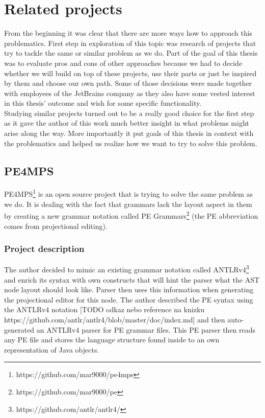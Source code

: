 \chapter{Related projects}

From the beginning it was clear that there are more ways how to approach this problematics. First step in exploration of this topic was research of projects that try to tackle the same or similar problem as we do. Part of the goal of this thesis was to evaluate pros and cons of other approaches because we had to decide whether we will build on top of these projects, use their parts or just be inspired by them and choose our own path. Some of those decisions were made together with employees of the JetBrains company as they also have some vested interest in this thesis' outcome and wish for some specific functionality.
\\

Studying similar projects turned out to be a really good choice for the first step as it gave the author of this work much better insight in what problems might arise along the way. More importantly it put goals of this thesis in context with the problematics and helped us realize how we want to try to solve this problem.

\section{PE4MPS}
PE4MPS\footnote{https://github.com/mar9000/pe4mps} is an open source project that is trying to solve the same problem as we do. It is dealing with the fact that grammars lack the layout aspect in them by creating a new grammar notation called PE Grammars\footnote{https://github.com/mar9000/pe} (the PE abbreviation comes from projectional editing).
 
\subsection{Project description}
The author decided to mimic an existing grammar notation called ANTLRv4\footnote{https://github.com/antlr/antlr4/} and enrich its syntax with own constructs that will hint the parser what the AST node layout should look like. Parser then uses this information when generating the projectional editor for this node. The author described the PE syntax using the ANTLRv4 notation [TODO odkaz nebo reference na knizku https://github.com/antlr/antlr4/blob/master/doc/index.md] and then auto-generated an ANTLRv4 parser for PE grammar files. This PE parser then reads any PE file and stores the language structure found inside to an own representation of Java objects.
\\

